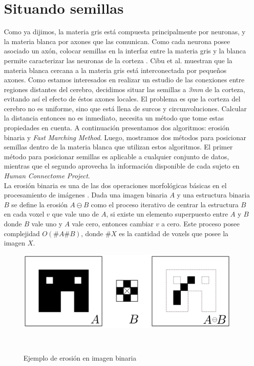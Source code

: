 \section{Situando semillas}
Como ya dijimos, la materia gris est\'a compuesta principalmente por neuronas,
y la materia blanca por axones que las comunican. Como cada neurona
posee asociado un ax\'on, colocar semillas en la interfaz entre la materia gris
y la blanca permite caracterizar las neuronas de la corteza \cite{Mori2002}
\cite{Anwander2006}. Cibu et al. \cite{Thomas2014} muestran que la materia blanca
cercana a la materia gris est\'a interconectada por peque\~nos axones. Como
estamos interesados en realizar un estudio de las conexiones entre regiones
distantes del cerebro, decidimos situar las semillas a \textit{3mm} de la corteza,
evitando as\'i el efecto de \'estos axones locales. El problema es que la corteza
del cerebro no es uniforme, sino que est\'a llena de surcos y circunvoluciones. 
Calcular la distancia entonces no es inmediato, necesita un m\'etodo que tome
estas propiedades en cuenta. A continuaci\'on presentamos dos algoritmos: 
erosi\'on binaria y \textit{Fast Marching Method}. Luego, mostramos dos m\'etodos
para posicionar semillas dentro de la materia blanca que utilizan estos algoritmos.
El primer m\'etodo para posicionar semillas es aplicable a cualquier conjunto de
datos, mientras que el segundo aprovecha la informaci\'on disponible de cada sujeto
en \textit{Human Connectome Project}. \\

La erosi\'on binaria es una de las dos operaciones morfol\'ogicas b\'asicas en el
procesamiento de im\'agenes \cite{Serra1983}. Dada una imagen binaria $A$ y una
estructura binaria $B$ se define la erosi\'on $ A \ominus B $ como el proceso
iterativo de centrar la estructura $B$ en cada voxel $v$ que vale uno de $A$, si
existe un elemento superpuesto entre $A$ y $B$ donde $B$ vale uno y $A$ vale cero,
entonces cambiar $v$ a cero. Este proceso posee complejidad $O(\#A\#B)$, donde 
$\#X$ es la cantidad de voxels que posee la imagen $X$.\\

\begin{figure}[h!]

\centering
\begin{minipage}[b]{0.7\textwidth}
    \includegraphics[width=\textwidth]{img/erosion.png}
    \caption{Ejemplo de erosi\'on en imagen binaria}
\end{minipage} ~

\end{figure}  

